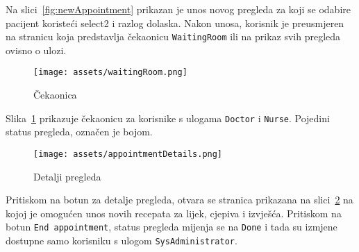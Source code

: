 Na slici~\ref{fig:newAppointment} prikazan je unos novog pregleda za koji se odabire pacijent koristeći select2 i razlog dolaska. Nakon unosa, korisnik je preusmjeren na stranicu koja predstavlja čekaonicu \texttt{WaitingRoom} ili na prikaz svih pregleda ovisno o ulozi.

\begin{figure}[H]
	\texttt{[image: assets/waitingRoom.png]}
	\centering
	\caption{Čekaonica}
	\label{fig:waitingRoom}
\end{figure}

Slika~\ref{fig:waitingRoom} prikazuje čekaonicu za korisnike s ulogama \texttt{Doctor} i \texttt{Nurse}. Pojedini status pregleda, označen je bojom.

\begin{figure}[H]
	\texttt{[image: assets/appointmentDetails.png]}
	\centering
	\caption{Detalji pregleda}
	\label{fig:appointmentDetails}
\end{figure}

Pritiskom na botun za detalje pregleda, otvara se stranica prikazana na slici~\ref{fig:appointmentDetails} na kojoj je omogućen unos novih recepata za lijek, cjepiva i izvješća. Pritiskom na botun \texttt{End appointment}, status pregleda mijenja se na \texttt{Done} i tada su izmjene dostupne samo korisniku s ulogom \texttt{SysAdministrator}.
